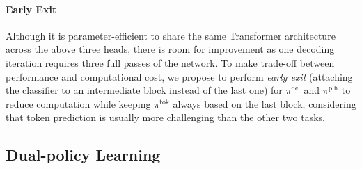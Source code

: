 \documentclass{article}
\begin{document}
\paragraph{Early Exit} Although it is parameter-efficient to share the same Transformer architecture across the above three heads, there is room for improvement as one decoding iteration requires three full passes of the network. To make trade-off between performance and computational cost, we propose to perform \textit{early exit} (attaching the classifier to an intermediate block instead of the last one) for $\pi^\textrm{del}$ and $\pi^\textrm{plh}$ to reduce computation while keeping $\pi^\textrm{tok}$ always based on the last block, considering that token prediction is usually more challenging than the other two tasks.

\subsection{Dual-policy Learning}
\label{sec.learning}
\end{document}
